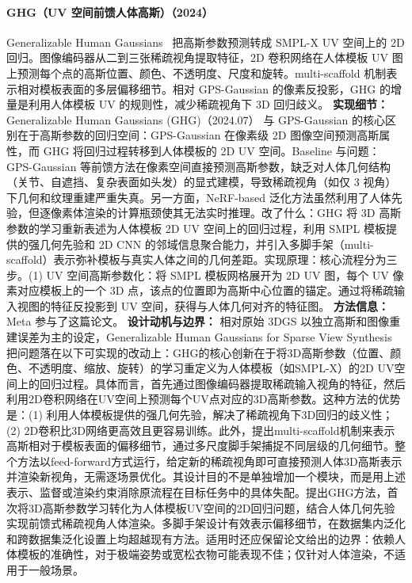 \paragraph{GHG（UV 空间前馈人体高斯）（2024）}
Generalizable Human Gaussians~\cite{2407_12777} 把高斯参数预测转成 SMPL-X UV 空间上的 2D 回归。图像编码器从二到三张稀疏视角提取特征，2D 卷积网络在人体模板 UV 图上预测每个点的高斯位置、颜色、不透明度、尺度和旋转。multi-scaffold 机制表示相对模板表面的多层偏移细节。相对 GPS-Gaussian 的像素反投影，GHG 的增量是利用人体模板 UV 的规则性，减少稀疏视角下 3D 回归歧义。
\textbf{实现细节：} Generalizable Human Gaussians (GHG)（2024.07） 与 GPS-Gaussian 的核心区别在于高斯参数的回归空间：GPS-Gaussian 在像素级 2D 图像空间预测高斯属性，而 GHG 将回归过程转移到人体模板的 2D UV 空间。Baseline 与问题：GPS-Gaussian 等前馈方法在像素空间直接预测高斯参数，缺乏对人体几何结构（关节、自遮挡、复杂表面如头发）的显式建模，导致稀疏视角（如仅 3 视角）下几何和纹理重建严重失真。另一方面，NeRF-based 泛化方法虽然利用了人体先验，但逐像素体渲染的计算瓶颈使其无法实时推理。改了什么：GHG 将 3D 高斯参数的学习重新表述为人体模板 2D UV 空间上的回归过程，利用 SMPL 模板提供的强几何先验和 2D CNN 的邻域信息聚合能力，并引入多脚手架（multi-scaffold）表示弥补模板与真实人体之间的几何差距。实现原理：核心流程分为三步。(1) UV 空间高斯参数化：将 SMPL 模板网格展开为 2D UV 图，每个 UV 像素对应模板上的一个 3D 点，该点的位置即为高斯中心位置的锚定。通过将稀疏输入视图的特征反投影到 UV 空间，获得与人体几何对齐的特征图。
\textbf{方法信息：} Meta 参与了这篇论文。
\textbf{设计动机与边界：} 相对原始 3DGS 以独立高斯和图像重建误差为主的设定，Generalizable Human Gaussians for Sparse View Synthesis 把问题落在以下可实现的改动上：GHG的核心创新在于将3D高斯参数（位置、颜色、不透明度、缩放、旋转）的学习重定义为人体模板（如SMPL-X）的2D UV空间上的回归过程。具体而言，首先通过图像编码器提取稀疏输入视角的特征，然后利用2D卷积网络在UV空间上预测每个UV点对应的3D高斯参数。这种方法的优势是：(1) 利用人体模板提供的强几何先验，解决了稀疏视角下3D回归的歧义性；(2) 2D卷积比3D网络更高效且更容易训练。此外，提出multi-scaffold机制来表示高斯相对于模板表面的偏移细节，通过多尺度脚手架捕捉不同层级的几何细节。整个方法以feed-forward方式运行，给定新的稀疏视角即可直接预测人体3D高斯表示并渲染新视角，无需逐场景优化。其设计目的不是单独增加一个模块，而是用上述表示、监督或渲染约束消除原流程在目标任务中的具体失配。提出GHG方法，首次将3D高斯参数学习转化为人体模板UV空间的2D回归问题，结合人体几何先验实现前馈式稀疏视角人体渲染。多脚手架设计有效表示偏移细节，在数据集内泛化和跨数据集泛化设置上均超越现有方法。适用时还应保留论文给出的边界：依赖人体模板的准确性，对于极端姿势或宽松衣物可能表现不佳；仅针对人体渲染，不适用于一般场景。
